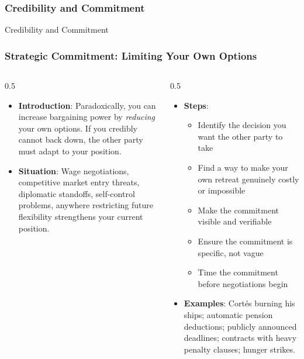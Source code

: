 \begin{frame}[fragile]\frametitle{Credibility and Commitment}
\begin{center}
{\Large Credibility and Commitment}
\end{center}
\end{frame}

\begin{frame}[fragile]\frametitle{Strategic Commitment: Limiting Your Own Options}
\begin{columns}
    \begin{column}[T]{0.5\linewidth}
      \begin{itemize}
        \item \textbf{Introduction}: Paradoxically, you can increase bargaining power by \textit{reducing} your own options. If you credibly cannot back down, the other party must adapt to your position.
        \item \textbf{Situation}: Wage negotiations, competitive market entry threats, diplomatic standoffs, self-control problems, anywhere restricting future flexibility strengthens your current position.
      \end{itemize}
    \end{column}
    \begin{column}[T]{0.5\linewidth}
      \begin{itemize}
        \item \textbf{Steps}:
        \begin{itemize}
          \item Identify the decision you want the other party to take
          \item Find a way to make your own retreat genuinely costly or impossible
          \item Make the commitment visible and verifiable
          \item Ensure the commitment is specific, not vague
          \item Time the commitment before negotiations begin
        \end{itemize}\item \textbf{Examples}: Cortés burning his ships; automatic pension deductions; publicly announced deadlines; contracts with heavy penalty clauses; hunger strikes.
      \end{itemize}
    \end{column}
  \end{columns}
\end{frame}


